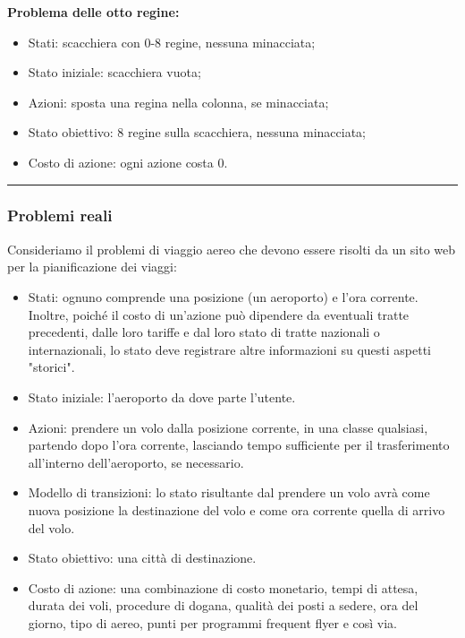\documentclass{article}
\begin{document}
\textbf{Problema delle otto regine:}
\begin{itemize}
    \item Stati: scacchiera con 0-8 regine, nessuna minacciata;
    \item Stato iniziale: scacchiera vuota;
    \item Azioni: sposta una regina nella colonna, se minacciata;
    \item Stato obiettivo: 8 regine sulla scacchiera, nessuna minacciata;
    \item Costo di azione: ogni azione costa 0.
\end{itemize}
\par\noindent\rule{\textwidth}{0.4pt}
\newpage
\subsubsection{Problemi reali}
Consideriamo il problemi di viaggio aereo che devono essere risolti da un sito web per la pianificazione dei viaggi:
\begin{itemize}
    \item Stati: ognuno comprende una posizione (un aeroporto) e l'ora corrente. Inoltre, poiché il costo di un'azione può dipendere da eventuali tratte precedenti, dalle loro tariffe e dal loro stato di tratte nazionali o internazionali, lo stato deve registrare altre informazioni su questi aspetti "storici".
    \item Stato iniziale: l'aeroporto da dove parte l'utente.
    \item Azioni: prendere un volo dalla posizione corrente, in una classe qualsiasi, partendo dopo l'ora corrente, lasciando tempo sufficiente per il trasferimento all'interno dell'aeroporto, se necessario.
    \item Modello di transizioni: lo stato risultante dal prendere un volo avrà come nuova posizione la destinazione del volo e come ora corrente quella di arrivo del volo.
    \item Stato obiettivo: una città di destinazione.
    \item Costo di azione: una combinazione di costo monetario, tempi di attesa, durata dei voli, procedure di dogana, qualità dei posti a sedere, ora del giorno, tipo di aereo, punti per programmi frequent flyer e così via.
\end{itemize}
\newpage
\end{document}
